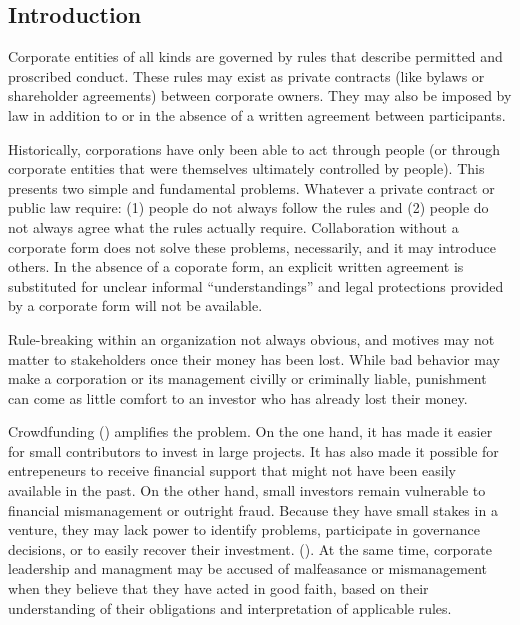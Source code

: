 \documentclass[9pt,oneside]{amsart}
\begin{document}
\setlength{\columnsep}{20pt}
\begin{multicols}{2}

\section{Introduction}\label{sec:introduction}

Corporate entities of all kinds are governed by rules that describe permitted and proscribed conduct.  These rules may exist as private contracts (like bylaws or shareholder agreements) between corporate owners.  They may also be imposed by law in addition to or in the absence of a written agreement between participants.

Historically, corporations have only been able to act through people (or through corporate entities that were themselves ultimately controlled by people).  This presents two simple and fundamental problems.  Whatever a private contract or public law require:  (1) people do not always follow the rules and (2) people do not always agree what the rules actually require.  Collaboration without a corporate form does not solve these problems, necessarily, and it may introduce others.  In the absence of a coporate form, an explicit written agreement is substituted for unclear informal ``understandings'' and legal protections provided by a corporate form will not be available.

Rule-breaking within an organization not always obvious, and motives may not matter to stakeholders once their money has been lost.  While bad behavior may make a corporation or its management civilly or criminally liable, punishment can come as little comfort to an investor who has already lost their money.   

Crowdfunding (\cite{2015CFReport}) amplifies the problem.  On the one hand, it has made it easier for small contributors to invest in large projects.  It has also made it possible for entrepeneurs to receive financial support that might not have been easily available in the past.  On the other hand, small investors remain vulnerable to financial mismanagement or outright fraud.  Because they have small stakes in a venture, they may lack power to identify problems, participate in governance decisions, or to easily recover their investment.  (\cite{9MostDisgracefulCrowdFundings, CrowdfundingFailTC}).  At the same time, corporate leadership and managment may be accused of malfeasance or mismanagement when they believe that they have acted in good faith, based on their understanding of their obligations and interpretation of applicable rules.


\end{multicols}
\end{document}
